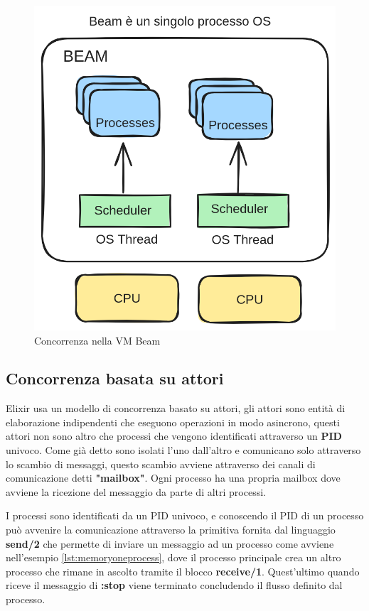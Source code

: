 \begin{figure}[!htp]
    \centering
    \includegraphics[keepaspectratio=true,scale=0.25]{images/beam_concurrency.png}
	\caption{Concorrenza nella VM Beam \cite{elixirInAction5}}
  	\label{fig:concorrenza_beam}
\end{figure}



\subsection{Concorrenza basata su attori}

Elixir usa un modello di concorrenza basato su attori,
gli attori sono entità di elaborazione indipendenti
che eseguono operazioni in modo asincrono, questi attori
non sono altro che processi che vengono identificati
attraverso un \textbf{PID} univoco. Come già detto
sono isolati l'uno dall'altro e
comunicano solo attraverso lo scambio di messaggi,
questo scambio avviene attraverso
dei canali di comunicazione detti \textbf{"mailbox"}.
Ogni processo ha una propria mailbox dove avviene la
ricezione del messaggio da parte di altri processi.

I processi sono identificati da un PID univoco,
e conoscendo il PID di un processo può avvenire la comunicazione
attraverso la primitiva fornita dal linguaggio \textbf{send/2}
che permette di inviare un messaggio ad un processo
come avviene nell'esempio \ref{lst:memoryoneprocess}, dove
il processo principale crea un altro processo che rimane in ascolto
tramite il blocco \textbf{receive/1}.
Quest'ultimo quando riceve il messaggio di \textbf{:stop}
viene terminato concludendo il flusso definito dal processo.

